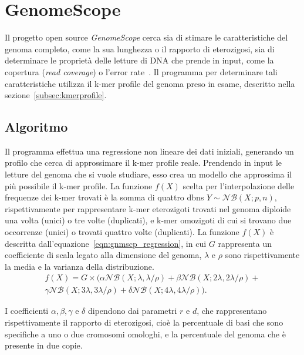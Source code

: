 \documentclass[crop=false, class=book]{standalone}
\begin{document}
	\section{GenomeScope}
	
	Il progetto open source \textit{GenomeScope} cerca sia di stimare le caratteristiche del genoma completo, come la sua lunghezza o il rapporto di eterozigosi, sia di determinare le proprietà delle letture di DNA che prende in input, come la copertura (\textit{read coverage}) o l'error rate~\cite{vurture2017genomescope}. Il programma per determinare tali caratteristiche utilizza il k-mer profile del genoma preso in esame, descritto nella sezione~\vref{subsec:kmerprofile}.
		

	\subsection{Algoritmo}
	Il programma effettua una regressione non lineare dei dati iniziali, generando un profilo che cerca di approssimare il k-mer profile reale. Prendendo in input le letture del genoma che si vuole studiare, esso crea un modello che approssima il più possibile il k-mer profile. La funzione $f(X)$ scelta per l'interpolazione delle frequenze dei k-mer trovati è la somma di quattro \glspl{dbn} $Y \sim \mathcal{NB}(X;p,n)$, rispettivamente per rappresentare k-mer eterozigoti trovati nel genoma diploide una volta (unici) o tre volte (duplicati), e k-mer omozigoti di cui si trovano due occorrenze (unici) o trovati quattro volte (duplicati). La funzione $f(X)$ è descritta dall'equazione~\vref{eqn:gnmscp_regression}, in cui $G$ rappresenta un coefficiente di scala legato alla dimensione del genoma, $\lambda$ e $\rho$ sono rispettivamente la media e la varianza della distribuzione. 
	\begin{multline}
		f(X) = G \times (\alpha \mathcal{NB}(X;\lambda, \lambda/\rho) + \beta \mathcal{NB}(X;2\lambda, 2\lambda/\rho) + \\
		\gamma \mathcal{NB}(X;3\lambda, 3\lambda/\rho) + \delta \mathcal{NB}(X;4\lambda, 4\lambda/\rho)  ).	
		\label{eqn:gnmscp_regression}
	\end{multline}

	I coefficienti $\alpha, \beta, \gamma$ e $\delta$ dipendono dai parametri $r$ e $d$, che rappresentano rispettivamente il rapporto di eterozigosi, cioè la percentuale di basi che sono specifiche a uno o due cromosomi omologhi, e la percentuale del genoma che è presente in due copie.
	
\end{document}
